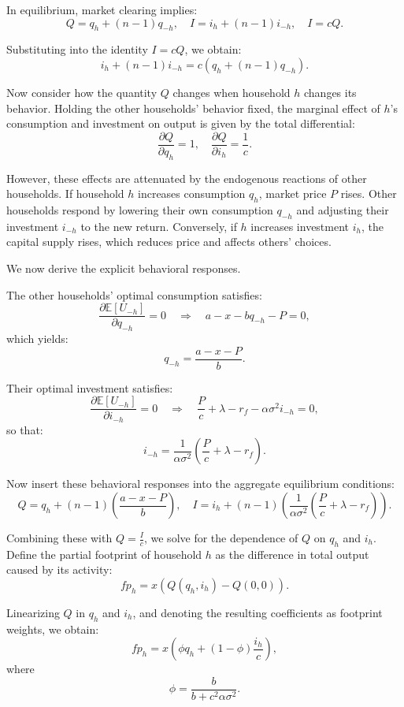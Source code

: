 \documentclass[12pt,a4paper]{article}%
\begin{document}
In equilibrium, market clearing implies:
\[
Q = q_h + (n - 1) q_{-h}, \quad I = i_h + (n - 1) i_{-h}, \quad I = cQ.
\]

Substituting into the identity \( I = cQ \), we obtain:
\[
i_h + (n - 1) i_{-h} = c \left( q_h + (n - 1) q_{-h} \right).
\]

Now consider how the quantity \( Q \) changes when household \( h \) changes its behavior. Holding the other households' behavior fixed, the marginal effect of \( h \)'s consumption and investment on output is given by the total differential:
\[
\frac{\partial Q}{\partial q_h} = 1, \quad \frac{\partial Q}{\partial i_h} = \frac{1}{c}.
\]

However, these effects are attenuated by the endogenous reactions of other households. If household \( h \) increases consumption \( q_h \), market price \( P \) rises. Other households respond by lowering their own consumption \( q_{-h} \) and adjusting their investment \( i_{-h} \) to the new return. Conversely, if \( h \) increases investment \( i_h \), the capital supply rises, which reduces price and affects others' choices.

We now derive the explicit behavioral responses.

The other households' optimal consumption satisfies:
\[
\frac{\partial \mathbb{E}[U_{-h}]}{\partial q_{-h}} = 0 \quad \Rightarrow \quad a - x - b q_{-h} - P = 0,
\]
which yields:
\[
q_{-h} = \frac{a - x - P}{b}.
\]

Their optimal investment satisfies:
\[
\frac{\partial \mathbb{E}[U_{-h}]}{\partial i_{-h}} = 0 \quad \Rightarrow \quad \frac{P}{c} + \lambda - r_f - \alpha \sigma^2 i_{-h} = 0,
\]
so that:
\[
i_{-h} = \frac{1}{\alpha \sigma^2} \left( \frac{P}{c} + \lambda - r_f \right).
\]

Now insert these behavioral responses into the aggregate equilibrium conditions:
\[
Q = q_h + (n - 1) \left( \frac{a - x - P}{b} \right), \quad I = i_h + (n - 1) \left( \frac{1}{\alpha \sigma^2} \left( \frac{P}{c} + \lambda - r_f \right) \right).
\]

Combining these with \( Q = \frac{I}{c} \), we solve for the dependence of \( Q \) on \( q_h \) and \( i_h \). Define the partial footprint of household \( h \) as the difference in total output caused by its activity:
\[
fp_h = x \left( Q(q_h, i_h) - Q(0, 0) \right).
\]

Linearizing \( Q \) in \( q_h \) and \( i_h \), and denoting the resulting coefficients as footprint weights, we obtain:
\[
fp_h = x \left( \phi q_h + (1 - \phi) \frac{i_h}{c} \right),
\]
where
\[
\phi = \frac{b}{b + c^2 \alpha \sigma^2}.
\]
\end{document}
